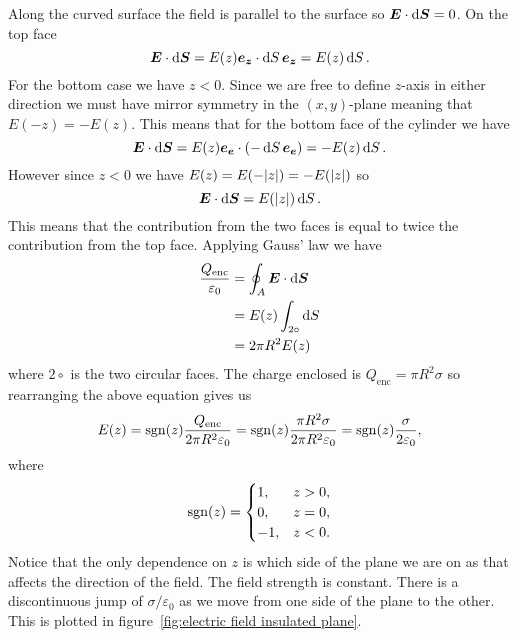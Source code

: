     Along the curved surface the field is parallel to the surface so \(\bm{E}\cdot\dd{\bm{S}} = 0\).
    On the top face
    \[\bm{E}\cdot\dd{\bm{S}} = E(z)\bm{e_{z}}\cdot\dd{S}\bm{e_{z}} = E(z)\dd{S}.\]
    For the bottom case we have \(z < 0\).
    Since we are free to define \(z\)-axis in either direction we must have mirror symmetry in the \((x, y)\)-plane meaning that \(E(-z) = -E(z)\).
    This means that for the bottom face of the cylinder we have
    \[\bm{E}\cdot\dd{\bm{S}} = E(z)\bm{e_{e}}\cdot(-\dd{S}\bm{e_{e}}) = -E(z)\dd{S}.\]
    However since \(z < 0\) we have \(E(z) = E(-\abs{z}) = -E(\abs{z})\) so
    \[\bm{E}\cdot\dd{\bm{S}} = E(\abs{z})\dd{S}.\]
    This means that the contribution from the two faces is equal to twice the contribution from the top face.
    Applying Gauss' law we have
    \begin{align*}
        \frac{Q_\mathrm{enc}}{\varepsilon_0} &= \oint_A\bm{E}\cdot\dd{\bm{S}}\\
        &= E(z)\int_{2\circ}\dd{S}\\
        &= 2\pi R^2E(z)
    \end{align*}
    where \(2\circ\) is the two circular faces.
    The charge enclosed is \(Q_\mathrm{enc} = \pi R^2\sigma\) so rearranging the above equation gives us
    \[E(z) = \operatorname{sgn}(z)\frac{Q_\mathrm{enc}}{2\pi R^2\varepsilon_0} = \operatorname{sgn}(z)\frac{\pi R^2\sigma}{2\pi R^2\varepsilon_0} = \operatorname{sgn}(z)\frac{\sigma}{2\varepsilon_0},\]
    where
    \[
        \operatorname{sgn}(z) = 
        \begin{cases}
            1, & z > 0,\\
            0, & z = 0,\\
            -1, & z < 0.
        \end{cases}
    \]
    Notice that the only dependence on \(z\) is which side of the plane we are on as that affects the direction of the field.
    The field strength is constant.
    There is a discontinuous jump of \(\sigma/\varepsilon_0\) as we move from one side of the plane to the other.
    This is plotted in figure~\ref{fig:electric field insulated plane}.
    

